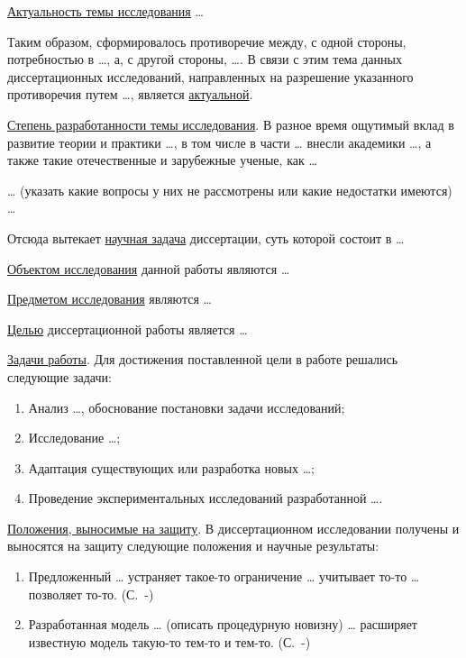 
\underline{Актуальность темы исследования} \dots{}

Таким образом, сформировалось противоречие между, с одной стороны,
потребностью в \dots{}, а, с другой стороны, \dots{}. В связи с этим
тема данных диссертационных исследований, направленных на разрешение
указанного противоречия путем \dots{}, является
\underline{актуальной}.

\underline{Степень разработанности темы исследования}. В разное время
ощутимый вклад в развитие теории и практики \dots{}, в том числе в
части \dots{} внесли академики \dots{}, а также такие отечественные и
зарубежные ученые, как \dots{}

\dots{} (указать какие вопросы у них не рассмотрены или какие
недостатки имеются) \dots{}

Отсюда вытекает \underline{научная задача} диссертации, суть которой
состоит в \dots{}

\underline{Объектом исследования} данной работы являются \dots{}

\underline{Предметом исследования} являются \dots{}

\underline{Целью} диссертационной работы является \dots{}

\underline{Задачи работы}. Для достижения поставленной цели в работе
решались следующие задачи:
\begin{enumerate}
\item Анализ \dots{}, обоснование постановки задачи исследований;
\item Исследование \dots{};
\item Адаптация существующих или разработка новых \dots{};
\item Проведение экспериментальных исследований разработанной \dots{}.
\end{enumerate}

\underline{Положения, выносимые на защиту}. В диссертационном
исследовании получены и выносятся на защиту следующие положения и
научные результаты:
\begin{enumerate}
\item Предложенный \dots{} устраняет такое-то ограничение \dots{}
  учитывает то-то \dots{} позволяет
  то-то. (С.~\pageref{sect1_1}-\pageref{sect1_1-eof})
\item Разработанная модель \dots{} (описать процедурную новизну)
  \dots{} расширяет известную модель такую-то тем-то и
  тем-то. (С.~\pageref{sect2_1}-\pageref{sect2_1-eof})
\end{enumerate}

